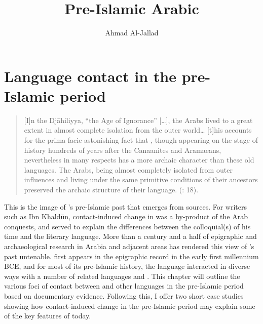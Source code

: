 \documentclass[output=paper]{langsci/langscibook}
\author{Ahmad Al-Jallad\affiliation{The Ohio State University}}
\title{Pre-Islamic Arabic}
\begin{document}
\maketitle
  
\section{Language contact in the pre-Islamic period}

\begin{quote}
[I]n the Djāhiliyya, ``the Age of Ignorance'' […], the Arabs lived to a great extent in almost complete isolation from the outer world… [t]his accounts for the prima facie astonishing fact that , though appearing on the stage of history hundreds of years after the Canaanites and Aramaeans, nevertheless in many respects has a more archaic character than these old  languages. The Arabs, being almost completely isolated from outer influences and living under the same primitive conditions of their ancestors preserved the archaic structure of their language. (\citealt{Blau1981}: 18).
\end{quote}
This is the image of ’s pre-Islamic past that emerges from   sources. For writers such as Ibn Khaldūn, contact-induced change in  was a by-product of the Arab conquests, and served to explain the differences between the colloquial(s) of his time and the literary language. More than a century and a half of epigraphic and archaeological research in Arabia and adjacent areas has rendered this view of ’s past untenable.  first appears in the epigraphic record in the early first millennium BCE, and for most of its pre-Islamic history, the language interacted in diverse ways with a number of related  languages and . This chapter will outline the various foci of contact between  and other languages in the pre-Islamic period based on documentary evidence. Following this, I offer two short case studies showing how contact-induced change in the pre-Islamic period may explain some of the key features of  today.   
\end{document}
